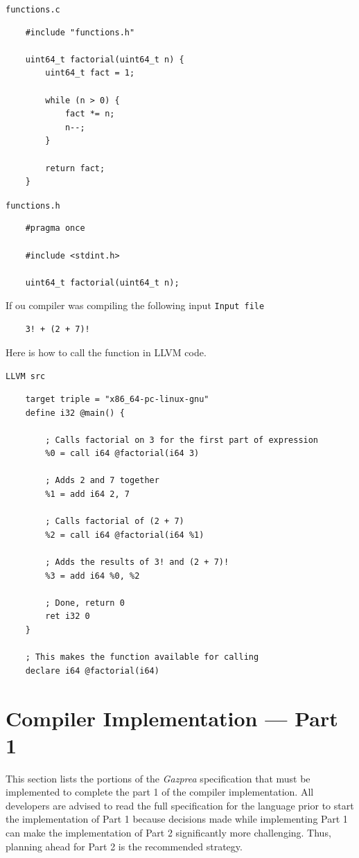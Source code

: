 \documentclass{article}
\begin{document}
    \texttt{functions.c}
    \begin{lstlisting}
    #include "functions.h"

    uint64_t factorial(uint64_t n) {
        uint64_t fact = 1;

        while (n > 0) {
            fact *= n;
            n--;
        }

        return fact;
    }
    \end{lstlisting}

    \texttt{functions.h}
    \begin{lstlisting}
    #pragma once

    #include <stdint.h>

    uint64_t factorial(uint64_t n);
    \end{lstlisting}

    If ou compiler was compiling the following input
    \texttt{Input file}
    \begin{lstlisting}
    3! + (2 + 7)!
    \end{lstlisting}
    Here is how to call the function in LLVM code.

    \texttt{LLVM src}
    \begin{lstlisting}
    target triple = "x86_64-pc-linux-gnu"
    define i32 @main() {

        ; Calls factorial on 3 for the first part of expression
        %0 = call i64 @factorial(i64 3)

        ; Adds 2 and 7 together
        %1 = add i64 2, 7

        ; Calls factorial of (2 + 7)
        %2 = call i64 @factorial(i64 %1)

        ; Adds the results of 3! and (2 + 7)!
        %3 = add i64 %0, %2

        ; Done, return 0
        ret i32 0
    }

    ; This makes the function available for calling
    declare i64 @factorial(i64)
    \end{lstlisting}

\section{Compiler Implementation --- Part 1}\label{sec:part1}
  This section lists the portions of the  \textit{Gazprea} specification that must be implemented to complete the part 1 of the compiler implementation.
All developers are advised to read the full
  specification for the language prior to start the implementation of Part 1 because decisions made while implementing Part 1 can make the implementation of Part 2 significantly more challenging. Thus, planning ahead for Part 2 is the recommended strategy.
\end{document}
